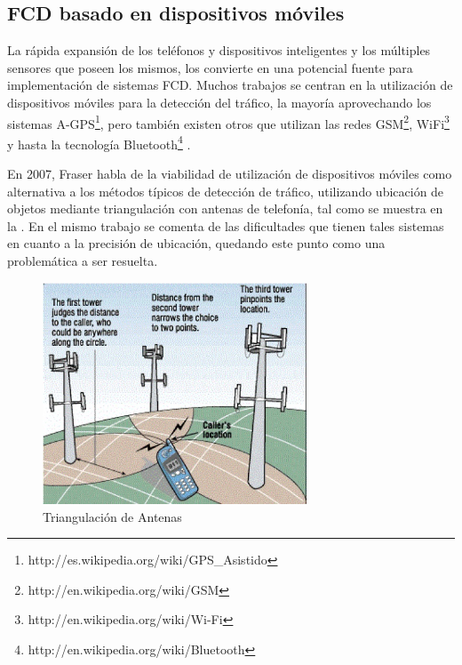 \subsection{FCD basado en dispositivos móviles}

La rápida expansión de los teléfonos y dispositivos inteligentes y los múltiples sensores que poseen los mismos, los convierte en una potencial fuente para implementación de sistemas FCD. Muchos trabajos se centran en la utilización de dispositivos móviles para la detección del tráfico, la mayoría aprovechando los sistemas A-GPS\footnote{http://es.wikipedia.org/wiki/GPS\_Asistido}, pero también existen otros que utilizan las redes GSM\footnote{http://en.wikipedia.org/wiki/GSM}, WiFi\footnote{http://en.wikipedia.org/wiki/Wi-Fi} y hasta la tecnología Bluetooth\footnote{http://en.wikipedia.org/wiki/Bluetooth} \cite{thiagarajan2010cooperative,thiagarajan2009vtrack,fraser2007use,fang2011enacq,ruppe2012augmenting}.

En 2007, Fraser \cite{fraser2007use} habla de la viabilidad de utilización de dispositivos móviles como alternativa a los métodos típicos de detección de tráfico, utilizando ubicación de objetos mediante triangulación con antenas de telefonía, tal como se muestra en la . En el mismo trabajo se comenta de las dificultades que tienen tales sistemas en cuanto a la precisión de ubicación, quedando este punto como una problemática a ser resuelta.

\begin{figure}[h]
	\centering
	\includegraphics[width=0.7\textwidth]{capitulos/3/figuras/figura5.jpg}
	\caption{\label{fig:triangulacionAntenas} Triangulación de Antenas}	
\end{figure}

